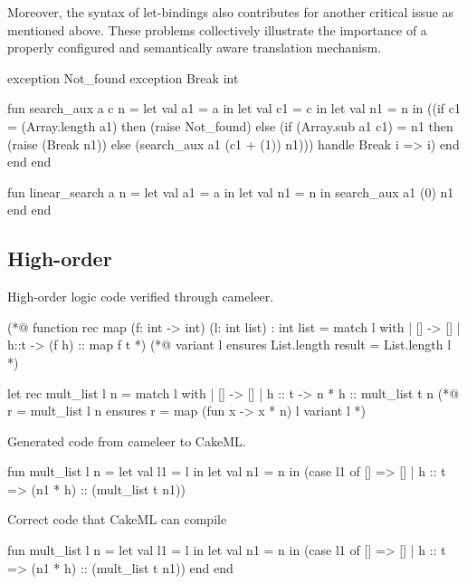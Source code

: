 Moreover, the syntax of let-bindings also contributes for another critical issue as mentioned above. These problems collectively 
illustrate the importance of a properly configured and semantically aware translation mechanism.

\begin{cakeml}

exception Not_found
exception Break int

fun search_aux a c n = let val a1 = a in
  let val c1 = c in
  let val n1 = n in
  ((if c1 = (Array.length a1) then (raise Not_found) 
    else (if (Array.sub  a1 c1) = n1 then (raise (Break n1)) 
          else (search_aux a1 (c1 + (1)) n1)))
  handle Break i => i)
  end end end

fun linear_search a n =
  let val a1 = a in let val n1 = n in search_aux a1 (0) n1 
  end end

\end{cakeml}

\subsection{High-order}

High-order logic code verified through cameleer.

\begin{gospell}
    (*@ function rec map (f: int -> int) (l: int list) : int list = 
            match l with
            | [] -> []
            | h::t -> (f h) :: map f t *)
    (*@ variant l
            ensures List.length result = List.length l *)

    let rec mult_list l n =
        match l with
        | [] -> []
        | h :: t -> n * h :: mult_list t n
    (*@ r = mult_list l n
            ensures r = map (fun x -> x * n) l
            variant l *)
\end{gospell}

Generated code from cameleer to CakeML.

\begin{cakeml}
    fun mult_list l n = let val l1 = l in
        let val n1 = n in
        (case l1 of
            [] => []
        | h :: t => (n1 * h) :: (mult_list t n1))
\end{cakeml}

Correct code that CakeML can compile

\begin{cakeml}
    fun mult_list l n = let val l1 = l in
        let val n1 = n in
        (case l1 of
            [] => []
        | h :: t => (n1 * h) :: (mult_list t n1))
        end end
\end{cakeml}

